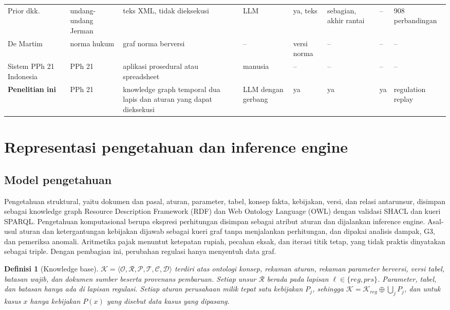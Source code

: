 \documentclass[conference]{IEEEtran}
\makeatletter
\DeclareRobustCommand{\en}[1]{{\usefont{\f@encoding}{\f@family}{\f@series}{it}#1\/}}
\newtheorem{definisi}{Definisi}
\newcommand{\K}{\mathcal{K}}
\makeatother
\begin{document}
\begin{table}[t]
\begin{tabularx}{\textwidth}{@{}P{2.9cm} P{1.9cm} L P{1.9cm} P{1.4cm} P{1.5cm} P{1.3cm} P{2.3cm}@{}}
Prior dkk.~\cite{prior2025risks} & undang-undang Jerman & teks XML, tidak dieksekusi & LLM & ya, teks & sebagian, akhir rantai & -- & 908 perbandingan \\
De Martim~\cite{demartim2025satgraph} & norma hukum & graf norma berversi & -- & versi norma & -- & -- & -- \\
Sistem PPh 21 Indonesia~\cite{ramadhani2021grossup,yulistyawati2022payroll,kusuma2026pph21} & PPh 21 & aplikasi prosedural atau \en{spreadsheet} & manusia & -- & -- & -- & -- \\
\midrule
\textbf{Penelitian ini} & PPh 21 & \en{knowledge graph} temporal dua lapis dan aturan yang dapat dieksekusi & LLM dengan gerbang & ya & ya & ya & \en{regulation replay} \\
\bottomrule
\end{tabularx}
\end{table}

\section{Representasi pengetahuan dan \en{inference engine}}
\label{sec:representasi}
\subsection{Model pengetahuan}
Pengetahuan struktural, yaitu dokumen dan pasal, aturan, parameter, tabel, konsep fakta, kebijakan, versi, dan relasi antarunsur, disimpan sebagai \en{knowledge graph} \en{Resource Description Framework} (RDF) dan \en{Web Ontology Language} (OWL) dengan validasi SHACL dan kueri SPARQL. Pengetahuan komputasional berupa ekspresi perhitungan disimpan sebagai atribut aturan dan dijalankan \en{inference engine}. Asal-usul aturan dan ketergantungan kebijakan dijawab sebagai kueri graf tanpa menjalankan perhitungan, dan dipakai analisis dampak, G3, dan pemeriksa anomali. Aritmetika pajak menuntut ketepatan rupiah, pecahan eksak, dan iterasi titik tetap, yang tidak praktis dinyatakan sebagai \en{triple}. Dengan pembagian ini, perubahan regulasi hanya menyentuh data graf.

\begin{definisi}[\en{Knowledge base}]
\label{def:kb}
$\K = \langle \mathcal{O}, \mathcal{R}, \mathcal{P}, \mathcal{T}, \mathcal{C}, \mathcal{D} \rangle$ terdiri atas ontologi konsep, rekaman aturan, rekaman parameter berversi, versi tabel, batasan wajib, dan dokumen sumber beserta provenans pembaruan. Setiap unsur $\mathcal{R}$ berada pada lapisan $\ell \in \{\mathit{reg}, \mathit{prs}\}$. Parameter, tabel, dan batasan hanya ada di lapisan regulasi. Setiap aturan perusahaan milik tepat satu kebijakan $P_j$, sehingga $\K = \K_{\mathit{reg}} \oplus \bigcup_j P_j$, dan untuk kasus $x$ hanya kebijakan $P(x)$ yang disebut data kasus yang dipasang.
\end{definisi}
\end{document}
